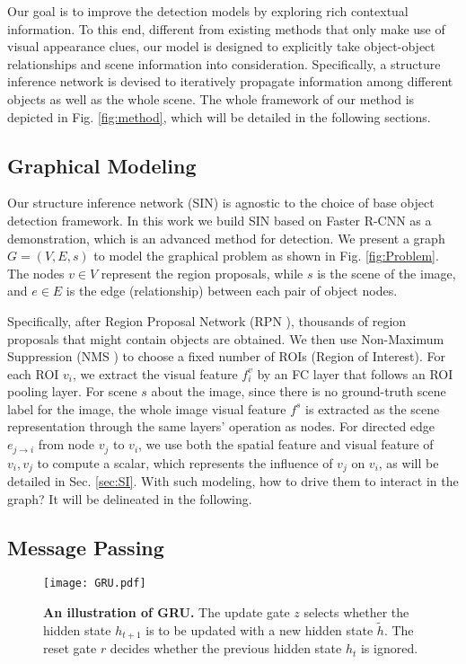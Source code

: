 \documentclass[10pt,twocolumn,letterpaper]{article}
\begin{document}
Our goal is to improve the detection models by exploring rich contextual information. To this end, different from existing methods that only make use of visual appearance clues, our model is designed to explicitly take object-object relationships and scene information into consideration. Specifically, a structure inference network is devised to iteratively propagate information among different objects as well as the whole scene. The whole framework of our method is depicted in Fig. \ref{fig:method}, which will be detailed in the following sections.

\subsection{Graphical Modeling}
Our structure inference network (SIN) is agnostic to the choice of base object detection framework. In this work we build SIN based on Faster R-CNN as a demonstration, which is an advanced method for detection. We present a graph $G=(V,E,s)$ to model the graphical problem as shown in Fig. \ref{fig:Problem}. The nodes $v \in V$ represent the region proposals, while $s$ is the scene of the image, and $e \in E$ is the edge (relationship) between each pair of object nodes.

Specifically, after Region Proposal Network (RPN \cite{Faster}), thousands of region proposals that might contain objects are obtained. We then use Non-Maximum Suppression (NMS \cite{NMS}) to choose a fixed number of ROIs (Region of Interest). For each ROI $v_i$, we extract the visual feature $f^{v}_{i}$ by an FC layer that follows an ROI pooling layer. For scene $s$ about the image, since there is no ground-truth scene label for the image, the whole image visual feature $f^{s}$ is extracted as the scene representation through the same layers' operation as nodes. {For directed edge $e_{j\to i}$ from node $v_{j}$ to $v_{i}$, we use both the spatial feature and visual feature of $v_i, v_j$ to compute a scalar, which represents the influence of $v_j$ on $v_i$, as will be detailed in Sec. \ref{sec:SI}}. { With such modeling, how to drive them to interact in the graph? It will be delineated in the following.} 

\subsection{Message Passing}

\begin{figure}[t]
\vspace{-2ex}
\begin{center}
   \texttt{[image: GRU.pdf]}
\end{center}
\vspace{-2ex}
   \caption{{\bf An illustration of GRU.} The update gate $z$ selects whether the hidden state $h_{t+1}$ is to be updated with a new hidden state $\tilde{h}$. The reset gate $r$ decides whether the previous hidden state $h_t$ is ignored.} 
\label{fig:GRU}
\label{fig:onecol}
\vspace{-2.5ex}
\end{figure}
\end{document}

